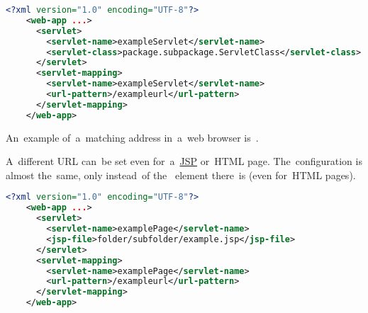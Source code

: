 \begin{lstlisting}[language=XML]
    <?xml version="1.0" encoding="UTF-8"?>
    <web-app ...>
      <servlet>
        <servlet-name>exampleServlet</servlet-name>
        <servlet-class>package.subpackage.ServletClass</servlet-class>
      </servlet>
      <servlet-mapping>
        <servlet-name>exampleServlet</servlet-name>
        <url-pattern>/exampleurl</url-pattern>
      </servlet-mapping>
    </web-app>
\end{lstlisting}

\noindent An~example of~a~matching address in~a~web browser is~.

A~different URL can~be set even for~a~\hyperref[jsp]{JSP} or~HTML page.
The~configuration is almost the~same, only instead~of the~ element there~is  (even for~HTML pages).

\begin{lstlisting}[language=XML]
    <?xml version="1.0" encoding="UTF-8"?>
    <web-app ...>
      <servlet>
        <servlet-name>examplePage</servlet-name>
        <jsp-file>folder/subfolder/example.jsp</jsp-file>
      </servlet>
      <servlet-mapping>
        <servlet-name>examplePage</servlet-name>
        <url-pattern>/exampleurl</url-pattern>
      </servlet-mapping>
    </web-app>
\end{lstlisting}
